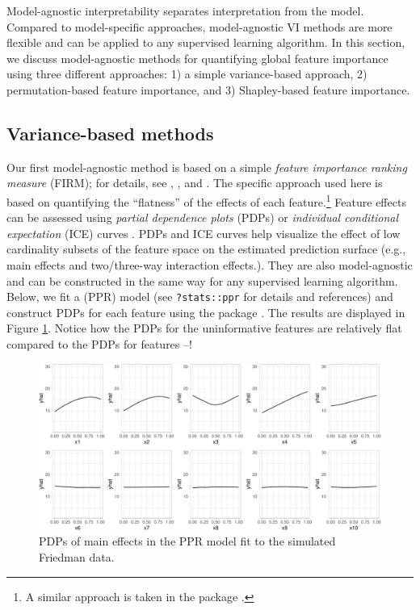 Model-agnostic interpretability separates interpretation from the model.
Compared to model-specific approaches, model-agnostic VI methods are
more flexible and can be applied to any supervised learning algorithm.
In this section, we discuss model-agnostic methods for quantifying
global feature importance using three different approaches: 1) a simple
variance-based approach, 2) permutation-based feature importance, and 3)
Shapley-based feature importance.

\subsection{Variance-based methods}

Our first model-agnostic method is based on a simple \emph{feature
importance ranking measure} (FIRM); for details, see
\citet{greenwell-simple-2018}, \citet{zien-2009-feature}, and
\citet{scholbeck-2019-sampling}. The specific approach used here is
based on quantifying the ``flatness'' of the effects of each
feature.\footnote{A similar approach is taken in the 
  package \citep{R-vivo}.} Feature effects can be assessed using
\emph{partial dependence plots} (PDPs) \citep{friedman-2001-greedy} or
\emph{individual conditional expectation} (ICE) curves
\citep{goldstein-peeking-2015}. PDPs and ICE curves help visualize the
effect of low cardinality subsets of the feature space on the estimated
prediction surface (e.g., main effects and two/three-way interaction
effects.). They are also model-agnostic and can be constructed in the
same way for any supervised learning algorithm. Below, we fit a
 (PPR) model (see
\texttt{?stats::ppr} for details and references) and construct PDPs for
each feature using the  package \citet{pdp2017}. The
results are displayed in Figure \ref{fig:pdp-ppr}. Notice how the PDPs
for the uninformative features are relatively flat compared to the PDPs
for features --!

\begin{Schunk}
\begin{figure}[!htb]

{\centering \includegraphics[width=1\linewidth]{greenwell-boehmke_files/figure-latex/pdp-ppr-1} 

}

\caption[PDPs of main effects in the PPR model fit to the simulated Friedman data]{PDPs of main effects in the PPR model fit to the simulated Friedman data.}\label{fig:pdp-ppr}
\end{figure}
\end{Schunk}

